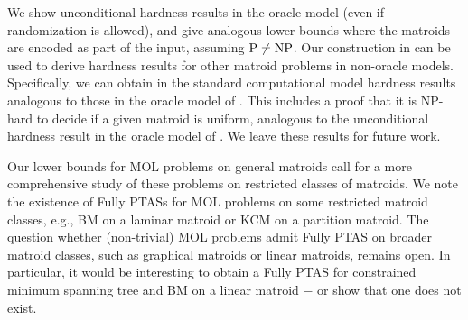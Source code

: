 \documentclass[11pt,letter]{article}
\begin{document}
We show unconditional hardness results in the oracle model (even if randomization is allowed), and give analogous lower bounds where the matroids are encoded as part of the input, assuming $\textnormal{P} \neq \textnormal{NP}$. Our construction in  can be used to derive hardness results for other matroid problems in non-oracle models.
Specifically, we can obtain in the standard computational model
hardness results analogous to those in the oracle model of \cite{JK82}.
This includes a proof that it is NP-hard to decide if a given matroid is uniform, analogous to the unconditional hardness result in the oracle model of \cite{JK82}. We leave these results for future work. 

Our lower bounds for MOL problems on general matroids call for a more comprehensive study of these problems on restricted classes of matroids. We note the existence of Fully PTASs for MOL problems on some restricted matroid classes, e.g., BM on a laminar matroid
 or KCM on a partition matroid.
The question whether (non-trivial) MOL problems admit Fully PTAS on broader matroid classes,
 such as graphical matroids or linear matroids, remains open.
In particular, it would be interesting to obtain a Fully PTAS for {\sc constrained minimum spanning tree} \cite{HL04} and BM on a linear matroid $-$ or show that one does not exist. 
				
				
				\newpage



	
	
\end{document}
